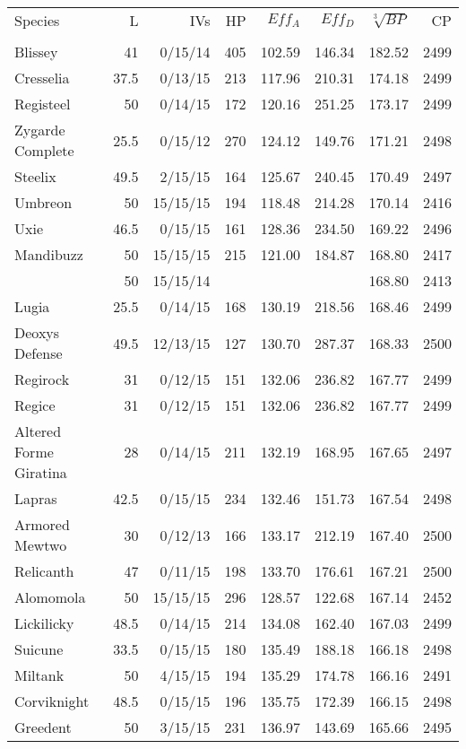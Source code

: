 \begin{longtable}{lrrrrrrr}
Species & L & IVs & HP & $Eff_A$ & $Eff_D$ & $\sqrt[3]{BP}$ & CP \\
\Midrule\\
\endhead
Blissey & 41 & 0/15/14 & 405 & 102.59 & 146.34 & 182.52 & 2499\\
Cresselia & 37.5 & 0/13/15 & 213 & 117.96 & 210.31 & 174.18 & 2499\\
Registeel & 50 & 0/14/15 & 172 & 120.16 & 251.25 & 173.17 & 2499\\
Zygarde Complete & 25.5 & 0/15/12 & 270 & 124.12 & 149.76 & 171.21 & 2498\\
Steelix & 49.5 & 2/15/15 & 164 & 125.67 & 240.45 & 170.49 & 2497\\
Umbreon & 50 & 15/15/15 & 194 & 118.48 & 214.28 & 170.14 & 2416\\
Uxie & 46.5 & 0/15/15 & 161 & 128.36 & 234.50 & 169.22 & 2496\\
Mandibuzz & 50 & 15/15/15 & 215 & 121.00 & 184.87 & 168.80 & 2417\\
 & 50 & 15/15/14 & & & & 168.80 & 2413\\
Lugia & 25.5 & 0/14/15 & 168 & 130.19 & 218.56 & 168.46 & 2499\\
Deoxys Defense & 49.5 & 12/13/15 & 127 & 130.70 & 287.37 & 168.33 & 2500\\
Regirock & 31 & 0/12/15 & 151 & 132.06 & 236.82 & 167.77 & 2499\\
Regice & 31 & 0/12/15 & 151 & 132.06 & 236.82 & 167.77 & 2499\\
Altered Forme Giratina & 28 & 0/14/15 & 211 & 132.19 & 168.95 & 167.65 & 2497\\
Lapras & 42.5 & 0/15/15 & 234 & 132.46 & 151.73 & 167.54 & 2498\\
Armored Mewtwo & 30 & 0/12/13 & 166 & 133.17 & 212.19 & 167.40 & 2500\\
Relicanth & 47 & 0/11/15 & 198 & 133.70 & 176.61 & 167.21 & 2500\\
Alomomola & 50 & 15/15/15 & 296 & 128.57 & 122.68 & 167.14 & 2452\\
Lickilicky & 48.5 & 0/14/15 & 214 & 134.08 & 162.40 & 167.03 & 2499\\
Suicune & 33.5 & 0/15/15 & 180 & 135.49 & 188.18 & 166.18 & 2498\\
Miltank & 50 & 4/15/15 & 194 & 135.29 & 174.78 & 166.16 & 2491\\
Corviknight & 48.5 & 0/15/15 & 196 & 135.75 & 172.39 & 166.15 & 2498\\
Greedent & 50 & 3/15/15 & 231 & 136.97 & 143.69 & 165.66 & 2495\\

\end{longtable}
